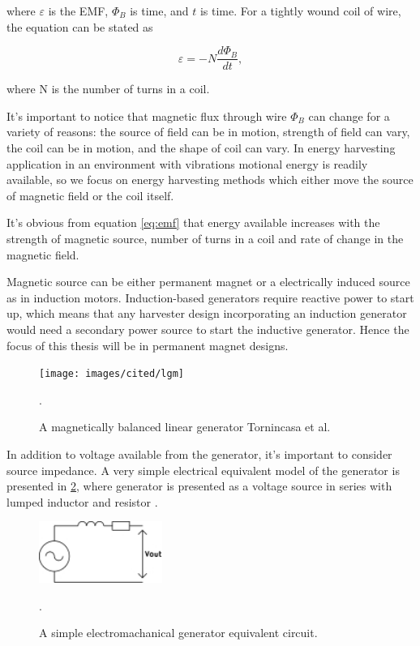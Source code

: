 where $\varepsilon$ is the EMF, $\Phi_{B}$ is time, and $t$ is time. For a tightly wound coil of wire, the equation can be stated as 

\begin{equation} \label{eq:emf}
  \varepsilon = -N \frac{d \Phi_{B}}{d t} , 
\end{equation}

where N is the number of turns in a coil. \cite[p.999]{universityphysics}

It's important to notice that magnetic flux through wire $ \Phi_{B} $ can change for a variety of reasons: the source of field can be in motion, strength of field can vary, the coil can be in motion, and the shape of coil can vary. In energy harvesting application in an environment with vibrations motional energy is readily available, so we focus on energy harvesting methods which either move the source of magnetic field or the coil itself.

It's obvious from equation \eqref{eq:emf} that energy available increases with the strength of magnetic source, number of turns in a coil and rate of change in the magnetic field. 

Magnetic source can be either permanent magnet or a electrically induced source as in induction motors. Induction-based generators require reactive power to start up, which means that any harvester design incorporating an induction generator would need a secondary power source to start the inductive generator. Hence the focus of this thesis will be in permanent magnet designs.



\begin{figure}[htb]
\begin{center}
\texttt{[image: images/cited/lgm]}
\end{center}
\caption{A magnetically balanced linear generator Tornincasa et al. \cite{Tornincasa2012}}.
\label{lgm}
\end{figure}

In addition to voltage available from the generator, it's important to consider source impedance. A very simple electrical equivalent model of the generator is presented in \ref{gen_simple}, where generator is presented as a voltage source in series with lumped inductor and resistor \cite{Jirutitijaroen2012}. 

\begin{figure}[htb]
\begin{center}
\includegraphics[height=2cm]{images/own_dwg/gen_simple}
\end{center}
\caption{A simple electromachanical generator equivalent circuit.}.
\label{gen_simple}
\end{figure}


